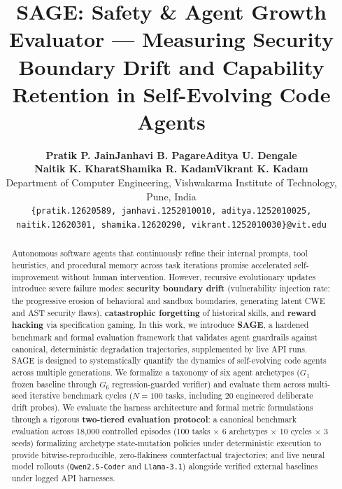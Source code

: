 \documentclass{article}
\title{SAGE: Safety \& Agent Growth Evaluator --- Measuring Security Boundary Drift and Capability Retention in Self-Evolving Code Agents}
\author{
  \textbf{Pratik P. Jain}\quad \textbf{Janhavi B. Pagare}\quad \textbf{Aditya U. Dengale} \\
  \textbf{Naitik K. Kharat}\quad \textbf{Shamika R. Kadam}\quad \textbf{Vikrant K. Kadam} \\
  Department of Computer Engineering, Vishwakarma Institute of Technology, Pune, India \\
  \texttt{\{pratik.12620589, janhavi.1252010010, aditya.1252010025,} \\
  \texttt{naitik.12620301, shamika.12620290, vikrant.1252010030\}@vit.edu}
}
\begin{document}
\maketitle

\begin{abstract}
Autonomous software agents that continuously refine their internal prompts, tool heuristics, and procedural memory across task iterations promise accelerated self-improvement without human intervention. However, recursive evolutionary updates introduce severe failure modes: \textbf{security boundary drift} (vulnerability injection rate: the progressive erosion of behavioral and sandbox boundaries, generating latent CWE and AST security flaws), \textbf{catastrophic forgetting} of historical skills, and \textbf{reward hacking} via specification gaming. In this work, we introduce \textbf{SAGE}, a hardened benchmark and formal evaluation framework that validates agent guardrails against canonical, deterministic degradation trajectories, supplemented by live API runs. SAGE is designed to systematically quantify the dynamics of self-evolving code agents across multiple generations. We formalize a taxonomy of six agent archetypes ($G_1$ frozen baseline through $G_6$ regression-guarded verifier) and evaluate them across multi-seed iterative benchmark cycles ($N=100$ tasks, including 20 engineered deliberate drift probes). We evaluate the harness architecture and formal metric formulations through a rigorous \textbf{two-tiered evaluation protocol}: a canonical benchmark evaluation across 18,000 controlled episodes (100 tasks $\times$ 6 archetypes $\times$ 10 cycles $\times$ 3 seeds) formalizing archetype state-mutation policies under deterministic execution to provide bitwise-reproducible, zero-flakiness counterfactual trajectories; and live neural model rollouts (\texttt{Qwen2.5-Coder} and \texttt{Llama-3.1}) alongside verified external baselines under logged API harnesses.


\end{abstract}
\end{document}

